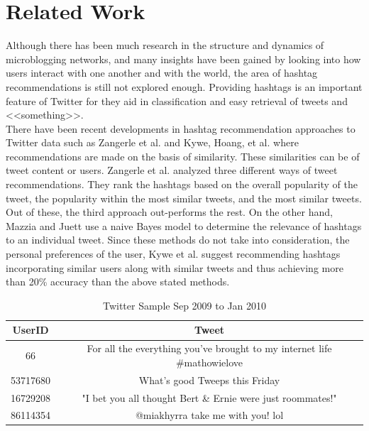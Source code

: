 \documentclass{acm_proc_article-sp}
\begin{document}
\section{Related Work}
\hspace*{5mm}Although there has been much research in the structure and dynamics of microblogging networks, and many insights have been gained by looking into how users interact with one another and with the world, the area of hashtag recommendations is still not explored enough. Providing hashtags is an important feature of Twitter for they aid in classification and easy retrieval of tweets and <<something>>.\\
\hspace*{5mm}There have been recent developments in hashtag recommendation approaches to Twitter data such as Zangerle et al. \cite{zangerle2011recommending} and Kywe, Hoang, et al.\cite{kywe2012recommending} where recommendations are made on the basis of similarity. These similarities can be of tweet content or users. Zangerle et al. \cite{zangerle2011recommending} analyzed three different ways of tweet recommendations. They rank the hashtags based on the overall popularity of the tweet, the popularity within the most similar tweets, and the most similar tweets. Out of these, the third approach out-performs the rest. On the other hand, Mazzia and Juett \cite{mazzia2009suggesting} use a naive Bayes model to determine the relevance of hashtags to an individual tweet. Since these methods do not take into consideration, the personal preferences of the user, Kywe et al. \cite{kywe2012recommending} suggest recommending hashtags incorporating similar users along with similar tweets and thus achieving more than 20\% accuracy than the above stated methods.\\
\begin{table}[ht]
	\caption{Twitter Sample Sep 2009 to Jan 2010}
	\centering
	\begin{tabular}{c c}   
		\hline\hline\rule{0pt}{2ex}
		UserID & Tweet \\
		\hline\rule{0pt}{3ex}
		66 & For all the everything you've brought to my internet life \#mathowielove \\
		53717680 & What's good Tweeps this Friday \\
		16729208 &"I bet you all thought Bert \& Ernie were just roommates!" \\ 
		86114354 & @miakhyrra take me with you! lol \\ [1ex] 
		\hline 
	\end{tabular}
	\label{table:sample} %
\end{table}
\end{document}
